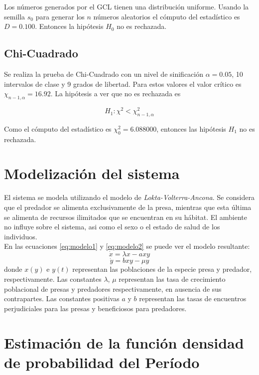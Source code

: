 \documentclass{SPANISH_acm_proc_article-sp}
\begin{document}
Los n\'umeros generados por el GCL tienen una distribuci\'on uniforme. Usando la semilla $s_{0}$ para generar los $n$ n\'umeros aleatorios el c\'omputo del estad\'istico es $D = 0.100$. Entonces la hip\'otesis $H_{0}$ no es rechazada. 

\subsection{Chi-Cuadrado}
Se realiza la prueba de Chi-Cuadrado con un nivel de sinificaci\'on $\alpha = 0.05$, 10 intervalos de clase y 9 grados de libertad. Para estos valores el valor cr\'itico es $\chi_{n-1, \alpha} = 16.92$. La hip\'otesis a ver que no es rechazada es 

\begin{equation}
		H_{1}: \chi^2 < \chi^2_{n - 1, \alpha}
\end{equation}

Como el c\'omputo del estad\'istico es $\chi^2_{0} = 6.088000$, entonces las hip\'otesis $H_{1}$ no es rechazada.

\section{Modelizaci\'on del sistema}
\label{sec:modelo}
El sistema se modela utilizando el modelo de \textit{Lokta-Volterra-Ancona}. Se considera que el predador
se alimenta exclusivamente de la presa, mientras que esta \'ultima se alimenta de recursos ilimitados
que se encuentran en su h\'abitat. El ambiente no influye sobre el sistema, asi como el sexo o
el estado de salud de los individuos.\\
En las ecuaciones \ref{eq:modelo1} y \ref{eq:modelo2} se puede ver el modelo resultante:
\begin{equation}
\label{eq:modelo1}
\dot{x} = \lambda x - axy
\end{equation}
\begin{equation}
\label{eq:modelo2}
\dot{y} = bxy - \mu y
\end{equation}
donde $x(y)$ e $y(t)$ representan las poblaciones de la especie presa y predador, 
respectivamente. Las constantes $\lambda$, $\mu$ representan las tasa de crecimiento
poblacional de presas y predadores respectivamente, en ausencia de sus contrapartes.
Las constantes positivas $a$ y $b$ representan las tasas de encuentros perjudiciales para 
las presas y beneficiosos para predadores.\\


\section{Estimaci\'on de la funci\'on densidad de probabilidad del Per\'iodo}
\label{sec:estimacion}
\end{document}
